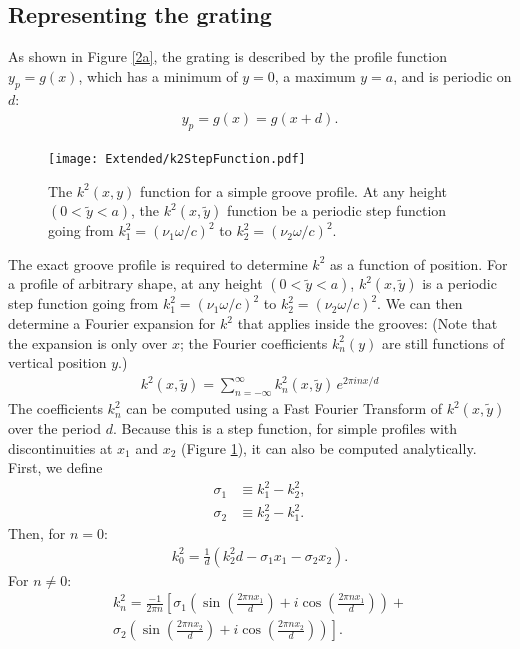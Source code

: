 \subsection{Representing the grating}

As shown in Figure \ref{2a}, the grating is described by the profile function $y_p = g(x)$, which has a minimum of $y=0$, a maximum $y=a$, and is periodic on $d$:
\begin{align}
y_p = g(x) = g(x+d).
\end{align}
\label{k2Expansion}

\begin{figure}[htbp] %
   \centering
   \texttt{[image: Extended/k2StepFunction.pdf]} 
   \caption[The $k^2(x, y)$ function for a simple groove profile.]{The $k^2(x, y)$ function for a simple groove profile. At any height $(0<\tilde y<a)$, the $k^2(x, \tilde y)$ function be a periodic step function going from $k^2_1=(\nu_1 \omega/c)^2$ to $k^2_2 = (\nu_2 \omega/c)^2$. }
   \label{k2StepFn}
\end{figure}

The exact groove profile is required to determine $k^2$ as a function of position. For a profile of arbitrary shape, at any height $(0<\tilde y<a)$, $k^2(x, \tilde y)$ is a periodic step function going from $k^2_1=(\nu_1 \omega/c)^2$ to $k^2_2 = (\nu_2 \omega/c)^2$.  We can then determine a Fourier expansion for $k^2$ that applies inside the grooves:  (Note that the expansion is only over $x$; the Fourier coefficients $k^2_n(y)$ are still functions of vertical position $y$.)
\begin{align}
\label{k2FourierExpansion}
k^2(x,\tilde y) = \sum \limits_{n=-\infty}^{\infty} k^2_n(x, \tilde y)\, e^{2\pi i n x/d}
\end{align}
The coefficients $k^2_n$ can be computed using a Fast Fourier Transform of $k^2(x,\tilde y)$ over the period $d$.  Because this is a step function, for simple profiles with discontinuities at $x_1$ and $x_2$ (Figure \ref{k2StepFn}), it can also be computed analytically. First, we define
\begin{align}
\sigma_1 &\equiv  k_1^2 - k_2^2, \\
\sigma_2 &\equiv k_2^2 - k_1^2.
\end{align}
Then, for $n=0$:
\begin{align}
k^2_0 = \frac{1}{d} \left( k_2^2d - \sigma_1 x_1 - \sigma_2 x_2 \right).
\end{align}
For $n\neq0$:
\begin{align}
k^2_n= \frac{-1}{2 \pi n} \left[ \sigma_1 \left( \sin \left(\frac{2\pi n x_1}{d}\right) + i \cos \left(\frac{2\pi n x_1}{d}\right) \right)  + \right. \\
\left. \sigma_2 \left( \sin \left(\frac{2\pi n x_2}{d}\right) + i \cos \left(\frac{2\pi n x_2}{d}\right) \right) \right].
\end{align}

